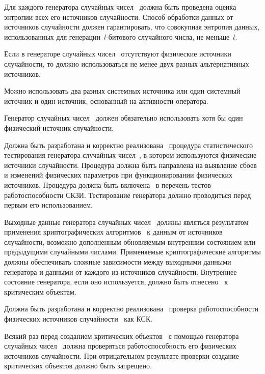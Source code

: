 \label{R.RN.Entropy} %
Для каждого генератора случайных чисел~ должна быть проведена
оценка энтропии всех его источников случайности.
%
Способ обработки данных от источников случайности должен гарантировать, что
совокупная энтропия данных, использованных для генерации~$l$-битового случайного
числа, не меньше~$l$.

\label{R.RN.Source1} %
Если в генераторе случайных чисел~ отсутствуют физические
источники случайности, то должно использоваться не менее двух разных
альтернативных источников.

\begin{note*}
Можно использовать два разных системных источника или один системный источник и
один источник, основанный на активности оператора.
\end{note*}

\label{R.RN.Source2} %
Генератор случайных чисел~ должен обязательно использовать
хотя бы один физический источник случайности.

\label{R.RN.Tests} %
Должна быть разработана и корректно
реализована~ процедура статистического
тестирования генератора случайных чисел~, в котором
используются физические источники случайности.
%
Процедура должна быть направлена на выявление сбоев и изменений физических
параметров при функционировании физических источников.
%
Процедура должна быть включена~ в перечень тестов 
работоспособности СКЗИ. Тестирование генератора должно проводиться перед 
первым его использованием. 

\label{R.RN.Crypto} %
Выходные данные генератора случайных чисел~
должны являться результатом применения криптографических 
алгоритмов~ к данным от источников случайности, 
возможно дополненным обновляемым внутренним состоянием
или предыдущими случайными числами.
%
Применяемые криптографические алгоритмы должны обеспечивать сложные зависимости
между выходными данными генератора и данными от каждого из источников
случайности.
%
Внутреннее состояние генератора, если оно используется, должно быть
отнесено~ к критическим объектам.

\label{R.RN.TotTest} %
Должна быть разработана и корректно
реализована~ проверка работоспособности
физических источников случайности~ как КСК.

\label{R.RN.GenCrit} %
Всякий раз перед созданием критических объектов~ с помощью
генератора случайных чисел~ должна проверяться
работоспособность его физических источников случайности.
%
При отрицательном результате проверки создание критических объектов должно быть
запрещено.
